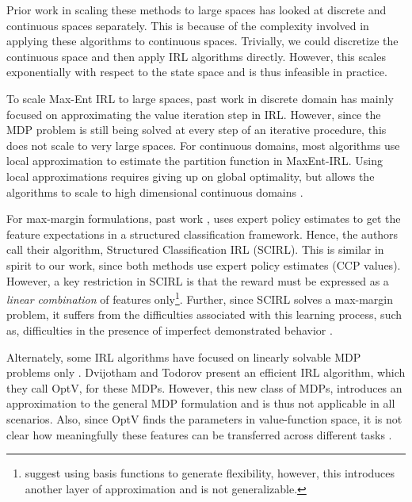 \documentclass{article}
\begin{document}
Prior work in scaling these methods to large spaces has looked at discrete and continuous spaces separately. This is because of the complexity involved in applying these algorithms to continuous spaces. 
Trivially, we could discretize the continuous space and then apply IRL algorithms directly. However, this scales exponentially with respect to the state space and is thus infeasible in practice. 

To scale Max-Ent IRL to large spaces, past work in discrete domain \cite{huang2015approximate} has mainly focused on approximating the value iteration step in IRL. However, since the MDP problem is still being solved at every step of an iterative procedure, this does not scale to very large spaces. For continuous domains, most algorithms use local approximation to estimate the partition function in MaxEnt-IRL. Using local approximations requires giving up on global optimality, but allows the algorithms to scale to high dimensional continuous domains \cite{levine2012continuous, kalakrishnan2013learning, finn2016guided}.

For max-margin formulations, past work \cite{klein2012inverse}, uses expert policy estimates to get the feature expectations in a structured classification framework. Hence, the authors call their algorithm, Structured Classification IRL (SCIRL). This is similar in spirit to our work, since both methods use expert policy estimates (CCP values). However, a key restriction in SCIRL is that the reward must be expressed as a \textit{linear combination} of features only\footnote{\cite{klein2012inverse} suggest using basis functions to generate flexibility, however, this introduces another layer of approximation and is not generalizable.}. Further, since SCIRL solves a max-margin problem, it suffers from the difficulties associated with this learning process, such as, difficulties in the presence of imperfect demonstrated behavior \cite{ziebart2010modeling}.

Alternately, some IRL algorithms have focused on linearly solvable MDP problems only \cite{todorov2007linearly}. Dvijotham and Todorov  present an efficient IRL algorithm, which they call OptV, for these MDPs. However, this new class of MDPs, introduces an approximation to the general MDP formulation and is thus not applicable in all scenarios.
Also, since OptV finds the parameters in value-function space, it is not clear how meaningfully these features can be transferred across different tasks \cite{levine2012continuous}.
\end{document}
